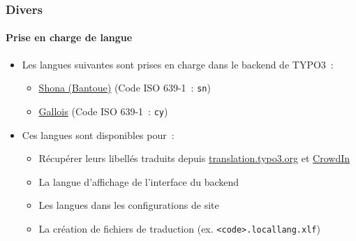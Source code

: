 %

\begin{frame}[fragile]
	\frametitle{Divers}
	\framesubtitle{Prise en charge de langue}

	\begin{itemize}
		\item Les langues suivantes sont prises en charge dans le backend de \newline
		    TYPO3~:
			\begin{itemize}
				\item \href{https://en.wikipedia.org/wiki/Shona_language}{Shona (Bantoue)}
					(Code ISO 639-1~: \texttt{sn})
				\item \href{https://en.wikipedia.org/wiki/Welsh_language}{Gallois}
					(Code ISO 639-1~: \texttt{cy})
			\end{itemize}
			\vspace{0.2cm}
		\item Ces langues sont disponibles pour~:
			\begin{itemize}
				\item Récupérer leurs libellés traduits depuis\newline
					\href{https://translation.typo3.org}{translation.typo3.org}
					et
					\href{https://crowdin.com}{CrowdIn}
				\item La langue d'affichage de l'interface du backend
				\item Les langues dans les configurations de site
				\item La création de fichiers de traduction (ex. \texttt{<code>.locallang.xlf})
			\end{itemize}

	\end{itemize}

\end{frame}

